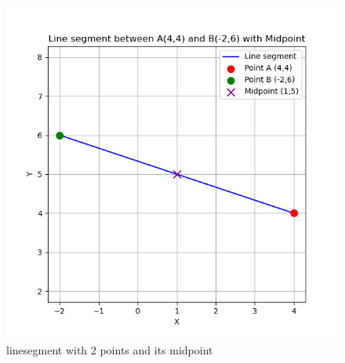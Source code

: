 \documentclass[journal]{IEEEtran}
\theoremstyle{remark}
\begin{document}
\begin{figure}[H]
    \centering
    \includegraphics[width=1\linewidth]{figs/line_segment.png}
    \caption{linesegment with 2 points and its midpoint}
    \label{fig:placeholder_1}
\end{figure}
\end{document}
